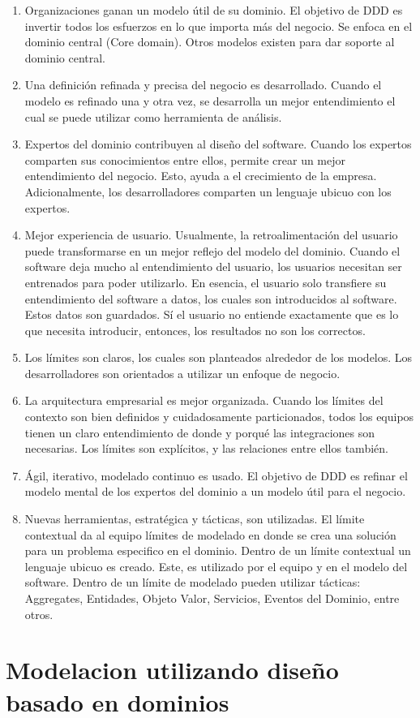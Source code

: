 \documentclass[12pt,twoside]{reedthesis}
\begin{document}
\begin{enumerate}
\def\labelenumi{\arabic{enumi}.}
\item
  Organizaciones ganan un modelo útil de su dominio. El objetivo de DDD es invertir todos los esfuerzos en lo que importa más del negocio. Se enfoca en el dominio central (Core domain). Otros modelos existen para dar soporte al dominio central.
\item
  Una definición refinada y precisa del negocio es desarrollado. Cuando el modelo es refinado una y otra vez, se desarrolla un mejor entendimiento el cual se puede utilizar como herramienta de análisis.
\item
  Expertos del dominio contribuyen al diseño del software. Cuando los expertos comparten sus conocimientos entre ellos, permite crear un mejor entendimiento del negocio. Esto, ayuda a el crecimiento de la empresa. Adicionalmente, los desarrolladores comparten un lenguaje ubicuo con los expertos.
\item
  Mejor experiencia de usuario. Usualmente, la retroalimentación del usuario puede transformarse en un mejor reflejo del modelo del dominio. Cuando el software deja mucho al entendimiento del usuario, los usuarios necesitan ser entrenados para poder utilizarlo. En esencia, el usuario solo transfiere su entendimiento del software a datos, los cuales son introducidos al software. Estos datos son guardados. Sí el usuario no entiende exactamente que es lo que necesita introducir, entonces, los resultados no son los correctos.
\item
  Los límites son claros, los cuales son planteados alrededor de los modelos. Los desarrolladores son orientados a utilizar un enfoque de negocio.
\item
  La arquitectura empresarial es mejor organizada. Cuando los límites del contexto son bien definidos y cuidadosamente particionados, todos los equipos tienen un claro entendimiento de donde y porqué las integraciones son necesarias. Los límites son explícitos, y las relaciones entre ellos también.
\item
  Ágil, iterativo, modelado continuo es usado. El objetivo de DDD es refinar el modelo mental de los expertos del dominio a un modelo útil para el negocio.
\item
  Nuevas herramientas, estratégica y tácticas, son utilizadas. El límite contextual da al equipo límites de modelado en donde se crea una solución para un problema especifico en el dominio. Dentro de un límite contextual un lenguaje ubicuo es creado. Este, es utilizado por el equipo y en el modelo del software. Dentro de un límite de modelado pueden utilizar tácticas: Aggregates, Entidades, Objeto Valor, Servicios, Eventos del Dominio, entre otros.
\end{enumerate}
\hypertarget{modelacion-utilizando-diseno-basado-en-dominios}{%
\chapter{Modelacion utilizando diseño basado en dominios}\label{modelacion-utilizando-diseno-basado-en-dominios}}
\end{document}
